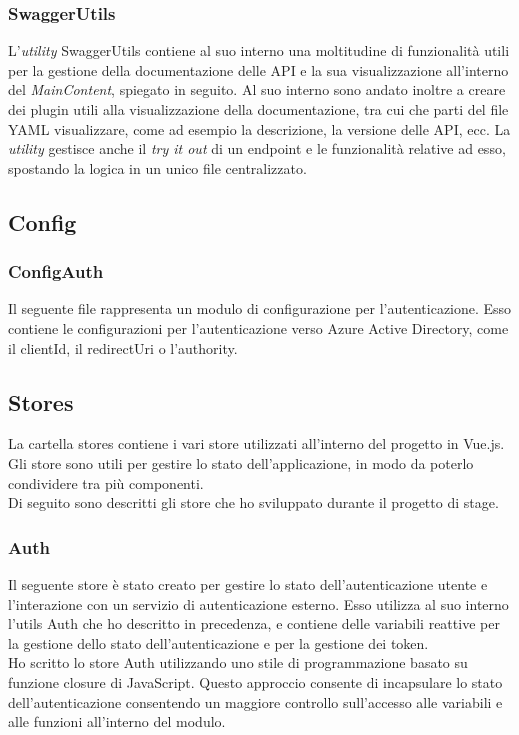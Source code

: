 \subsubsection{SwaggerUtils}\label{subsubsec:swagger-utils}
L'\textit{utility} SwaggerUtils contiene al suo interno una moltitudine di funzionalità utili per la gestione della documentazione delle API e la sua visualizzazione all'interno
del \textit{MainContent}, spiegato in seguito.
Al suo interno sono andato inoltre a creare dei plugin utili alla visualizzazione della documentazione, tra cui che parti del file YAML visualizzare, come ad esempio la descrizione, la versione delle API, ecc.
La \textit{utility} gestisce anche il \textit{try it out} di un endpoint e le funzionalità relative ad esso, spostando la logica in un unico file centralizzato.

\subsection{Config}\label{subsec:config}
\subsubsection{ConfigAuth}\label{subsubsec:config-auth}
Il seguente file rappresenta un modulo di configurazione per l'autenticazione. Esso contiene le configurazioni per l'autenticazione verso Azure Active Directory,
come il clientId, il redirectUri o l'authority.  

\subsection{Stores}\label{subsec:store}
La cartella stores contiene i vari store utilizzati all'interno del progetto in Vue.js. Gli store sono utili per gestire lo stato dell'applicazione,
in modo da poterlo condividere tra più componenti.\\
Di seguito sono descritti gli store che ho sviluppato durante il progetto di stage.

\subsubsection{Auth}\label{subsubsec:auth-store}
Il seguente store è stato creato per gestire lo stato dell'autenticazione utente e l'interazione con un servizio di autenticazione esterno.
Esso utilizza al suo interno l'utils Auth che ho descritto in precedenza, e contiene delle variabili reattive per la gestione dello stato dell'autenticazione
e per la gestione dei token.\\
Ho scritto lo store Auth utilizzando uno stile di programmazione basato su funzione closure di JavaScript. Questo approccio consente di incapsulare
lo stato dell'autenticazione consentendo un maggiore controllo sull'accesso alle variabili e alle funzioni all'interno del modulo.

